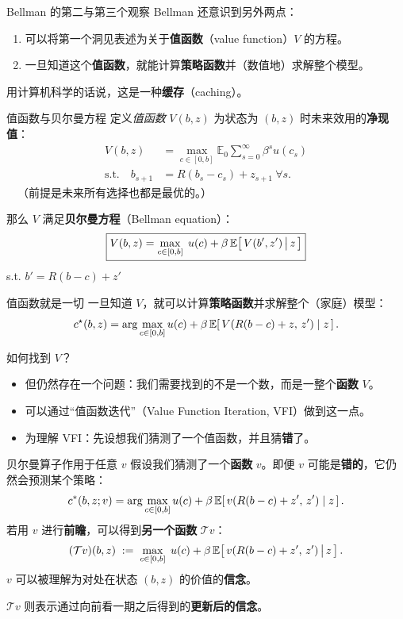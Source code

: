 \documentclass[10pt,aspectratio=169]{beamer}
\begin{document}
\begin{frame}{Bellman 的第二与第三个观察}
  Bellman 还意识到另外两点：
  \begin{enumerate}
    \item[2.] 可以将第一个洞见表述为关于\textbf{值函数}（value function）$V$ 的方程。
    \item[3.] 一旦知道这个\textbf{值函数}，就能计算\textbf{策略函数}并（数值地）求解整个模型。
  \end{enumerate}
  用计算机科学的话说，这是一种\textbf{缓存}（caching）。
\end{frame}

\begin{frame}{值函数与贝尔曼方程}
  定义\emph{值函数} $V(b, z)$ 为状态为 $(b, z)$ 时未来效用的\textbf{净现值}：
  \begin{align*}
    V(b, z) &= \max_{c\in[0,b]} \mathbb{E}_0 \sum_{s=0}^\infty \beta^{s} u(c_s)\\
    \text{s.t.} \quad b_{s+1} &= R(b_s - c_s) + z_{s+1}\ \forall s.
  \end{align*}
  $\quad$（前提是未来所有选择也都是最优的。）

  那么 $V$ 满足\textbf{贝尔曼方程}（Bellman equation）：
  \[
    \boxed{V(b, z) = \max_{c \in [0, b]} \; u(c) + \beta \, \mathbb{E}\!\left[\, V(b', z') \,\big|\, z \,\right]}
  \]
  s.t. $b' = R(b-c) + z'$
\end{frame}

\begin{frame}{值函数就是一切}
  一旦知道 $V$，就可以计算\textbf{策略函数}并求解整个（家庭）模型：
  \[
  c^\star(b, z) = \arg\max_{c \in [0, b]} u(c) + \beta \, \mathbb{E}\!\left[\, V(R(b-c) + z,\, z') \mid z \,\right].
  \]
\end{frame}

\begin{frame}{如何找到 $V$？}
  \begin{itemize}
    \item 但仍然存在一个问题：我们需要找到的不是一个数，而是一整个\textbf{函数} $V$。
    \item 可以通过``值函数迭代''（Value Function Iteration, VFI）做到这一点。
    \item 为理解 VFI：先设想我们猜测了一个值函数，并且猜\textbf{错}了。
  \end{itemize}

\end{frame}

\begin{frame}{贝尔曼算子作用于任意 $v$}
  假设我们猜测了一个\textbf{函数} $v$。即便 $v$ 可能是\textbf{错的}，它仍然会预测某个策略：
  \[
    c^*(b, z; v) = \arg\max_{c \in [0, b]} u(c) + \beta \, \mathbb{E}\!\left[\, v(R(b-c) + z',\, z') \mid z \,\right].
  \]
  若用 $v$ 进行\textbf{前瞻}，可以得到\textbf{另一个函数} $\mathcal{T}v$：
  \[
    (\mathcal{T} v)(b, z) \;:=\; \max_{c \in [0, b]} \; u(c) + \beta \, \mathbb{E}\!\left[\, v(R(b-c) + z',\, z') \,\big|\, z \,\right].
  \]
  $v$ 可以被理解为对处在状态 $(b, z)$ 的价值的\textbf{信念}。

  $\mathcal{T}v$ 则表示通过向前看一期之后得到的\textbf{更新后的信念}。
\end{frame}
\end{document}

